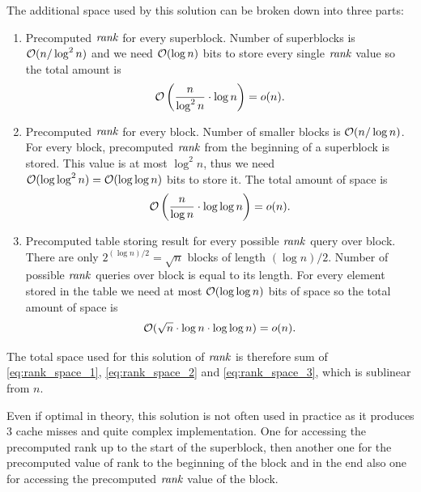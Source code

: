 The additional space used by this solution can be broken down into three parts:
\begin{enumerate}
    \item Precomputed $\mathit{rank}$ for every superblock. Number of superblocks is $\mathcal{O}(n/\log^2 n)$
    and we need $\mathcal{O}(\log n)$ bits to store every single $\mathit{rank}$ value so the total amount is
    \begin{equation}
        \mathcal{O}\left(\frac{n}{\log^2 n}\cdot \log n\right) = o(n).
        \label{eq:rank_space_1}
    \end{equation}
    \item Precomputed $\mathit{rank}$ for every block. Number of smaller blocks is $\mathcal{O}(n/\log n)$. For every
    block, precomputed $\mathit{rank}$ from the beginning of a superblock is stored. This value is at most $\log^2 n$,
    thus we need $\mathcal{O}(\log\log^2 n)=\mathcal{O}(\log\log n)$ bits to store it. The total amount of space is
    \begin{equation}
        \mathcal{O}\left(\frac{n}{\log n}\cdot \log\log n\right)=o(n).
        \label{eq:rank_space_2}
    \end{equation}
    \item Precomputed table storing result for every possible $\mathit{rank}$ query over block. There are only
    $2^{(\log n)/2} = \sqrt{n}$ blocks of length $(\log n)/2$. Number of possible $\mathit{rank}$ queries over
    block is equal to its length. For every element stored in the table we need at most $\mathcal{O}(\log\log n)$
    bits of space so the total amount of space is
    \begin{equation}
        \mathcal{O}(\sqrt{n}\cdot \log n\cdot \log\log n)=o(n).
        \label{eq:rank_space_3}
    \end{equation}
\end{enumerate}

The total space used for this solution of $\mathit{rank}$ is therefore sum of \ref{eq:rank_space_1}, \ref{eq:rank_space_2} and
\ref{eq:rank_space_3}, which is sublinear from $n$.

Even if optimal in theory, this solution is not often used in practice as it produces
3 cache misses and quite complex implementation. One for accessing the precomputed rank up
to the start of the superblock, then another one for the precomputed value of rank to the
beginning of the block and in the end also one for accessing the precomputed $\mathit{rank}$ value
of the block.


